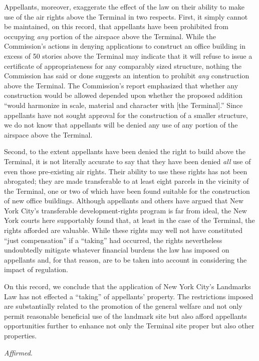Appellants, moreover, exaggerate the effect of the law on their ability to make
use of the air rights above the Terminal in two respects. First, it simply
cannot be maintained, on this record, that appellants have been prohibited from
occupying \textit{any} portion of the airspace above the Terminal. While the
Commission's actions in denying applications to construct an office building in
excess of 50 stories above the Terminal may indicate that it will refuse to
issue a certificate of appropriateness for any comparably sized structure,
nothing the Commission has said or done suggests an intention to prohibit
\textit{any} construction above the Terminal. The Commission's report emphasized
that whether any construction would be allowed depended upon whether the
proposed addition ``would harmonize in scale, material and character with [the
Terminal].'' Since appellants have not sought approval for the construction of a
smaller structure, we do not know that appellants will be denied any use of any
portion of the airspace above the Terminal.

Second, to the extent appellants have been denied the right to build above the
Terminal, it is not literally accurate to say that they have been denied
\textit{all} use of even those pre-existing air rights. Their ability to use
these rights has not been abrogated; they are made transferable to at least
eight parcels in the vicinity of the Terminal, one or two of which have been
found suitable for the construction of new office buildings. Although appellants
and others have argued that New York City's transferable development-rights
program is far from ideal, the New York courts here supportably found that, at
least in the case of the Terminal, the rights afforded are valuable. While these
rights may well not have constituted ``just compensation'' if a ``taking'' had
occurred, the rights nevertheless undoubtedly mitigate whatever financial
burdens the law has imposed on appellants and, for that reason, are to be taken
into account in considering the impact of regulation. 

On this record, we conclude that the application of New York City's Landmarks
Law has not effected a ``taking'' of appellants' property. The restrictions
imposed are substantially related to the promotion of the general welfare and
not only permit reasonable beneficial use of the landmark site but also afford
appellants opportunities further to enhance not only the Terminal site proper
but also other properties.

\textit{Affirmed}.

